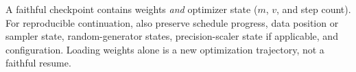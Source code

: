 A faithful checkpoint contains weights \emph{and} optimizer state ($m$, $v$, and step count). For reproducible continuation, also preserve schedule progress, data position or sampler state, random-generator states, precision-scaler state if applicable, and configuration. Loading weights alone is a new optimization trajectory, not a faithful resume.

\FloatBarrier
